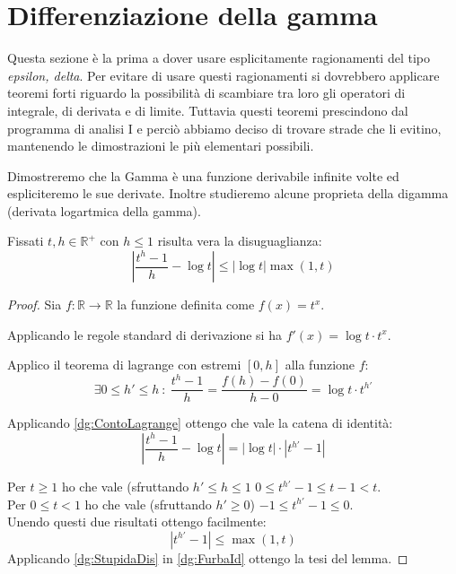 \section{Differenziazione della gamma}\label{dg}
Questa sezione è la prima a dover usare esplicitamente ragionamenti del tipo \emph{epsilon, delta}.
Per evitare di usare questi ragionamenti si dovrebbero applicare teoremi forti riguardo la possibilità
di scambiare tra loro gli operatori di integrale, di derivata e di limite.
Tuttavia questi teoremi prescindono dal programma di analisi I e perciò abbiamo deciso di trovare strade
che li evitino, mantenendo le dimostrazioni le più elementari possibili.

Dimostreremo che la Gamma è una funzione derivabile infinite volte ed espliciteremo le sue derivate.
Inoltre studieremo alcune proprieta della digamma (derivata logartmica della gamma).

\begin{lemma}\label{dg:LagrangeApprox}
	Fissati $t,h\in\mathbb{R^+}$ con $h\le1$ risulta vera la disuguaglianza:
	\begin{equation*}
		\left\lvert\frac{t^h-1}h-\log{t}\right\rvert\le \left\lvert\log{t}\right\rvert\max(1,t)
	\end{equation*}
\end{lemma}
\begin{proof}
	Sia $f:\mathbb{R}\to\mathbb{R}$ la funzione definita come $f(x)=t^x$.
	
	Applicando le regole standard di derivazione si ha $f'(x)=\log{t}\cdot t^x$.
	
	Applico il teorema di lagrange con estremi $[0,h]$ alla funzione $f$:
	\begin{equation}\label{dg:ContoLagrange}
		\exists 0\le h'\le h\ :\ \frac{t^h-1}h=\frac{f(h)-f(0)}{h-0}=\log{t}\cdot t^{h'}
	\end{equation}
	
	Applicando \cref{dg:ContoLagrange} ottengo che vale la catena di identità:
	\begin{equation}\label{dg:FurbaId}
		\left\lvert\frac{t^h-1}h-\log{t}\right\rvert=\left\lvert\log{t}\right\rvert \cdot \left\lvert t^{h'}-1\right\rvert
	\end{equation}
	
	Per $t\ge 1$ ho che vale (sfruttando $h'\le h\le 1$ $0\le t^{h'}-1\le t-1<t$.\\
	Per $0\le t<1$ ho che vale (sfruttando $h'\ge0$) $-1\le t^{h'}-1\le 0$.\\
	Unendo questi due risultati ottengo facilmente:
	\begin{equation}\label{dg:StupidaDis}
		\left\lvert t^{h'}-1\right\rvert \le \max(1,t)
	\end{equation}
	Applicando \cref{dg:StupidaDis} in \cref{dg:FurbaId} ottengo la tesi del lemma.
\end{proof}
